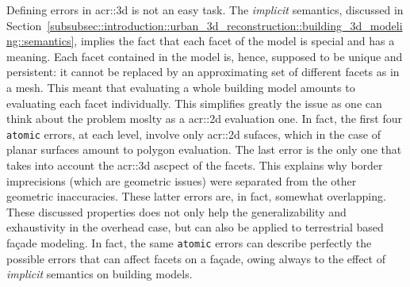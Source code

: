             \begin{figure}[htb]
                \centering
            \end{figure}

            Defining errors in \gls{acr::3d} is not an easy task.
            The \textit{implicit} semantics, discussed in Section~\ref{subsubsec::introduction::urban_3d_reconstruction::building_3d_modeling::semantics}, implies the fact that each facet of the model is special and has a meaning.
            Each facet contained in the model is, hence, supposed to be unique and persistent: it cannot be replaced by an approximating set of different facets as in a mesh.
            This meant that evaluating a whole building model amounts to evaluating each facet individually.
            This simplifies greatly the issue as one can think about the problem moslty as a \gls{acr::2d} evaluation one.
            In fact, the first four \texttt{atomic} errors, at each level, involve only \gls{acr::2d} sufaces, which in the case of planar surfaces amount to polygon evaluation.
            The last error is the only one that takes into account the \gls{acr::3d} ascpect of the facets.
            This explains why border imprecisions (which are geometric issues) were separated from the other geometric inaccuracies.
            These latter errors are, in fact, somewhat overlapping.
            These discussed properties does not only help the generalizability and exhaustivity in the overhead case, but can also be applied to terrestrial based fa\c{c}ade modeling.
            In fact, the same \texttt{atomic} errors can describe perfectly the possible errors that can affect facets on a fa\c{c}ade, owing always to the effect of \textit{implicit} semantics on building models.
        
